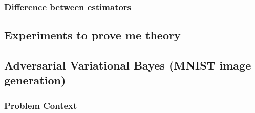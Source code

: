 \documentclass[a4paper,12pt]{article}
\numberwithin{equation}{section}
\begin{document}
\subsubsection{Difference between estimators}



\subsection{Experiments to prove me theory}
\subsection{Adversarial Variational Bayes (MNIST image generation)}
\subsubsection{Problem Context}
\end{document}
